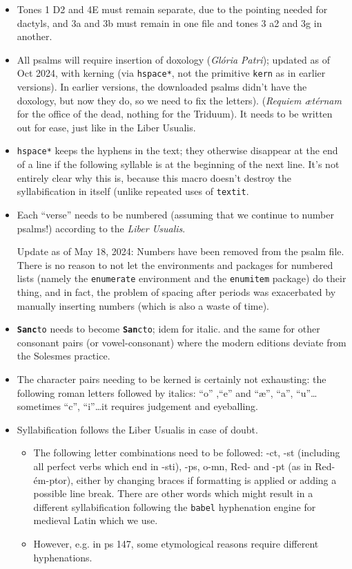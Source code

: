 \documentclass[11pt]{article}
\begin{document}
\begin{itemize}
\item Tones 1 D2 and 4E must remain separate, due to the pointing needed for dactyls, and 3a and 3b must remain in one file and tones 3 a2 and 3g in another.
  \item All psalms will require insertion of doxology (\textit{Glória Patri}); updated as of Oct 2024, with kerning (via \verb|hspace*|, not the primitive \verb|kern| as in earlier versions). In earlier versions, the downloaded psalms didn't have the doxology, but now they do, so we need to fix the letters). (\textit{Requiem ætérnam} for the office of the dead, nothing for the Triduum). It needs to be written out for ease, just like in the Liber Usualis.
  \item  \verb|hspace*| keeps the hyphens in the text; they otherwise disappear at the end of a line if the following syllable is at the beginning of the next line. It's not entirely clear why this is, because this macro doesn't destroy the syllabification in itself (unlike repeated uses of \verb|textit|.
  
   \item Each ``verse'' needs to be numbered (assuming that we continue to number psalms!) according to the \textit{Liber Usualis}.
 
 Update as of May 18, 2024: Numbers have been removed from the psalm file. There is no reason to not let the environments and packages for numbered lists (namely the \verb|enumerate| environment and the \verb|enumitem| package) do their thing, and in fact, the problem of spacing after periods was exacerbated by manually inserting numbers (which is also a waste of time).
 \item \texttt{\textbf{Sanc}to} needs to become \texttt{\textbf{San}cto}; idem for italic. and the same for other consonant pairs (or vowel-consonant) where the modern editions deviate from the Solesmes practice.
 \item The character pairs needing to be kerned is certainly not exhausting: the following roman letters followed by italics: ``o'' ,``e'' and ``æ'', ``a'', ``u''…sometimes ``c'', ``i''…it requires judgement and eyeballing.
 \item
   Syllabification follows the Liber Usualis in case of doubt.
   \begin{itemize}
   \item
  The following letter combinations need to be followed: -ct, -st (including all perfect verbs which end in -sti), -ps, o-mn, Red- and -pt (as in Red-ém-ptor), either by changing braces if formatting is applied or adding a possible line break. There are other words which might result in a different syllabification following the \verb|babel| hyphenation engine for medieval Latin which we use.
  \item However, e.g. in ps 147, some etymological reasons require different hyphenations.
\end{itemize}
\end{itemize}
\end{document}
